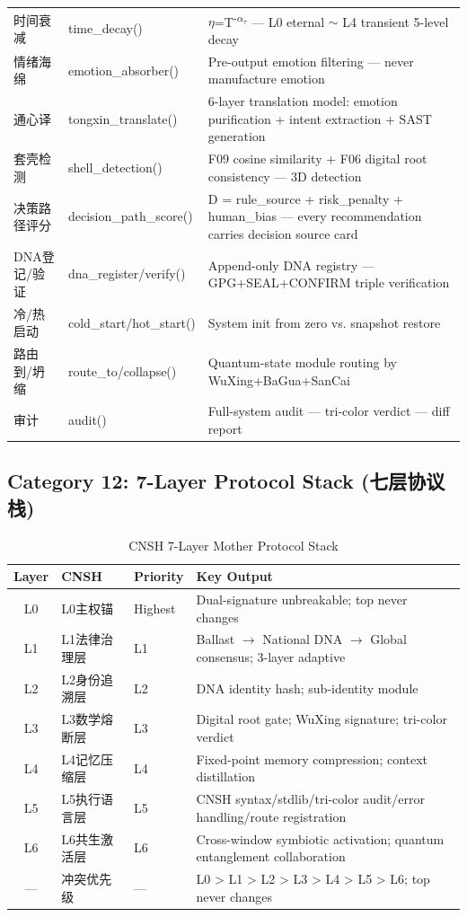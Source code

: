 \begin{table}[h]
\begin{tabular}{llp{6cm}}
时间衰减 & time\_decay() & $\eta$=T\textsuperscript{-$\alpha_\tau$} — L0 eternal $\sim$ L4 transient 5-level decay \\
情绪海绵 & emotion\_absorber() & Pre-output emotion filtering — never manufacture emotion \\
通心译 & tongxin\_translate() & 6-layer translation model: emotion purification + intent extraction + SAST generation \\
套壳检测 & shell\_detection() & F09 cosine similarity + F06 digital root consistency — 3D detection \\
决策路径评分 & decision\_path\_score() & D = rule\_source + risk\_penalty + human\_bias — every recommendation carries decision source card \\
DNA登记/验证 & dna\_register/verify() & Append-only DNA registry — GPG+SEAL+CONFIRM triple verification \\
冷/热启动 & cold\_start/hot\_start() & System init from zero vs. snapshot restore \\
路由到/坍缩 & route\_to/collapse() & Quantum-state module routing by WuXing+BaGua+SanCai \\
审计 & audit() & Full-system audit — tri-color verdict — diff report \\
\bottomrule
\end{tabular}
\end{table}

\subsection{Category 12: 7-Layer Protocol Stack (七层协议栈)}
\label{app:ren-protocol}

\begin{table}[h]
\centering
\caption{CNSH 7-Layer Mother Protocol Stack}
\renewcommand{\arraystretch}{1.2}
\fontsize{9}{11}\selectfont
\begin{tabular}{cllp{5cm}}
\toprule
\textbf{Layer} & \textbf{CNSH} & \textbf{Priority} & \textbf{Key Output} \\
\midrule
L0 & L0主权锚 & Highest & Dual-signature unbreakable; top never changes \\
L1 & L1法律治理层 & L1 & Ballast $\to$ National DNA $\to$ Global consensus; 3-layer adaptive \\
L2 & L2身份追溯层 & L2 & DNA identity hash; sub-identity module \\
L3 & L3数学熔断层 & L3 & Digital root gate; WuXing signature; tri-color verdict \\
L4 & L4记忆压缩层 & L4 & Fixed-point memory compression; context distillation \\
L5 & L5执行语言层 & L5 & CNSH syntax/stdlib/tri-color audit/error handling/route registration \\
L6 & L6共生激活层 & L6 & Cross-window symbiotic activation; quantum entanglement collaboration \\
— & 冲突优先级 & — & L0 > L1 > L2 > L3 > L4 > L5 > L6; top never changes \\
\bottomrule
\end{tabular}
\end{table}

